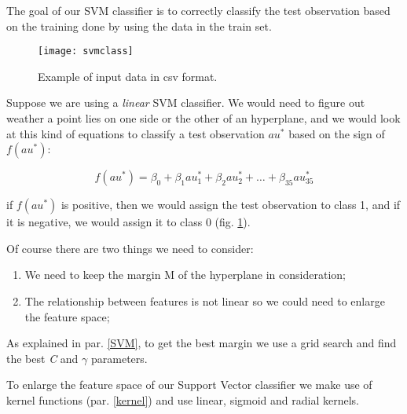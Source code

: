 The goal of our SVM classifier is to correctly classify the test observation based on the training done by using the data in the train set.

\begin{figure}[H]
	\centering
	\texttt{[image: svmclass]}
	\caption{Example of input data in csv format.}
	\label{fig:svmclass}
\end{figure}

Suppose we are using a \textit{linear} SVM classifier. We would need to figure out weather a point lies on one side or the other of an hyperplane, and we would look at this kind of equations to classify a test observation $au^*$ based on the sign of $f(au^*)$:

\begin{equation} 
	f(au^*) = \beta_0 + \beta_1 au^*_{1} + \beta_2 au^*_{2} + \dots + \beta_{35} au^*_{35}
\end{equation}

if $f(au^*)$ is positive, then we would assign the test observation to class 1, and if it is negative, we would assign it to class 0 (fig. \ref{fig:svmclass}).

Of course there are two things we need to consider:
\begin{enumerate}
	\item We need to keep the margin M of the hyperplane in consideration;
	\item The relationship between features is not linear so we could need to enlarge the feature space;
\end{enumerate}

As explained in par. \ref{SVM}, to get the best margin we use a grid search and find the best \textit{C} and $\gamma$ parameters.

To enlarge the feature space of our Support Vector classifier we make use of kernel functions (par. \ref{kernel}) and use linear, sigmoid and radial kernels.






